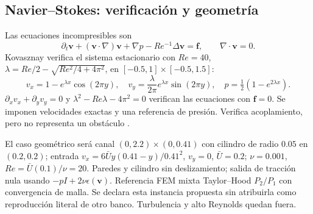 \subsection{Navier--Stokes: verificación y geometría}
Las ecuaciones incompresibles son
\begin{equation}\partial_t\mathbf v+(\mathbf v\cdot\nabla)\mathbf v+\nabla p-Re^{-1}\Delta\mathbf v=\mathbf f,\qquad\nabla\cdot\mathbf v=0.\end{equation}
Kovasznay verifica el sistema estacionario con $Re=40$, $\lambda=Re/2-\sqrt{Re^2/4+4\pi^2}$, en $[-0.5,1]\times[-0.5,1.5]$:
\begin{equation}v_x=1-e^{\lambda x}\cos(2\pi y),\quad v_y=\frac\lambda{2\pi}e^{\lambda x}\sin(2\pi y),\quad p=\tfrac12(1-e^{2\lambda x}).\end{equation}
$\partial_xv_x+\partial_yv_y=0$ y $\lambda^2-Re\lambda-4\pi^2=0$ verifican las ecuaciones con $\mathbf f=0$. Se imponen velocidades exactas y una referencia de presión. Verifica acoplamiento, pero no representa un obstáculo \cite{jin2021nsfnets}.

El caso geométrico será canal $(0,2.2)\times(0,0.41)$ con cilindro de radio $0.05$ en $(0.2,0.2)$; entrada $v_x=6\bar U y(0.41-y)/0.41^2$, $v_y=0$, $\bar U=0.2$; $\nu=0.001$, $Re=\bar U(0.1)/\nu=20$. Paredes y cilindro sin deslizamiento; salida de tracción nula usando $-pI+2\nu\epsilon(\mathbf v)$. Referencia FEM mixta Taylor--Hood $P_2/P_1$ con convergencia de malla. Se declara esta instancia propuesta sin atribuirla como reproducción literal de otro banco. Turbulencia y alto Reynolds quedan fuera.

